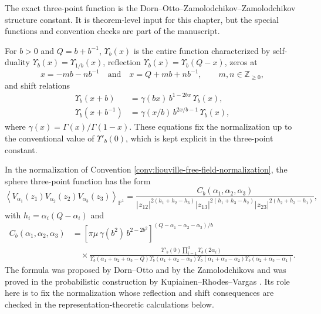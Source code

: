 The exact three-point function is the Dorn--Otto--Zamolodchikov--Zamolodchikov
structure constant.  It is theorem-level input for this chapter, but the
special functions and convention checks are part of the manuscript.

\begin{definition}
\label{def:upsilon-b-function}
For \(b>0\) and \(Q=b+b^{-1}\), \(\Upsilon_b(x)\) is the entire function
characterized by self-duality \(\Upsilon_b(x)=\Upsilon_{1/b}(x)\), reflection
\(\Upsilon_b(x)=\Upsilon_b(Q-x)\), zeros at
\[
  x=-mb-nb^{-1}
  \quad\text{and}\quad
  x=Q+mb+nb^{-1},
  \qquad m,n\in\mathbb Z_{\ge0},
\]
and shift relations
\begin{align}
  \Upsilon_b(x+b)
  &=
  \gamma(bx)\,b^{1-2bx}\,\Upsilon_b(x),
  \label{eq:upsilon-b-shift-b}\\
  \Upsilon_b(x+b^{-1})
  &=
  \gamma(x/b)\,b^{2x/b-1}\,\Upsilon_b(x),
  \label{eq:upsilon-b-shift-binverse}
\end{align}
where \(\gamma(x)=\Gamma(x)/\Gamma(1-x)\).  These equations fix the
normalization up to the conventional value of \(\Upsilon'_b(0)\), which is
kept explicit in the three-point constant.
\end{definition}

\begin{quotedtheorem}
\label{qthm:dozz-formula}
In the normalization of Convention
\ref{conv:liouville-free-field-normalization}, the sphere three-point
function has the form
\[
  \left\langle
    V_{\alpha_1}(z_1)V_{\alpha_2}(z_2)V_{\alpha_3}(z_3)
  \right\rangle_{\mathbb P^1}
  =
  \frac{
    C_b(\alpha_1,\alpha_2,\alpha_3)
  }{
    |z_{12}|^{2(h_1+h_2-h_3)}
    |z_{13}|^{2(h_1+h_3-h_2)}
    |z_{23}|^{2(h_2+h_3-h_1)}
  },
\]
with \(h_i=\alpha_i(Q-\alpha_i)\) and
\begin{equation}
\begin{aligned}
  C_b(\alpha_1,\alpha_2,\alpha_3)
  &=
  \left[
    \pi\mu\,\gamma(b^2)\,b^{2-2b^2}
  \right]^{(Q-\alpha_1-\alpha_2-\alpha_3)/b}
  \\
  &\quad\times
  \frac{
    \Upsilon'_b(0)
    \prod_{i=1}^3\Upsilon_b(2\alpha_i)
  }{
    \Upsilon_b(\alpha_1+\alpha_2+\alpha_3-Q)
    \Upsilon_b(\alpha_1+\alpha_2-\alpha_3)
    \Upsilon_b(\alpha_1+\alpha_3-\alpha_2)
    \Upsilon_b(\alpha_2+\alpha_3-\alpha_1)
  } .
\end{aligned}
  \label{eq:dozz-structure-constant}
\end{equation}
The formula was proposed by Dorn--Otto and by the Zamolodchikovs and was
proved in the probabilistic construction by Kupiainen--Rhodes--Vargas
\cite{DO1994,ZZ1996,KRV2020}.  Its role here is to fix the normalization
whose reflection and shift consequences are checked in the
representation-theoretic calculations below.
\end{quotedtheorem}

